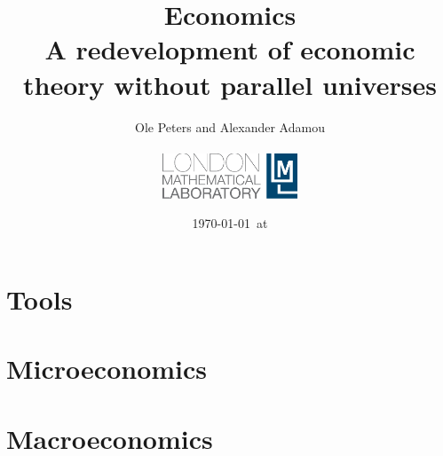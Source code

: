 


\title{Economics\\
\large{A redevelopment of economic theory without parallel universes}}
\author{Ole Peters and Alexander Adamou\\
\vspace{10cm}\\
\includegraphics[width=0.3\textwidth]{./lml_LOGO_whiteBG-eps-converted-to.pdf}}


\date{\today ~at \currenttime }

\maketitle

\tableofcontents
\newpage


\part{Tools}

\part{Microeconomics}



\part{Macroeconomics}




\FloatBarrier
\printnoidxglossaries




